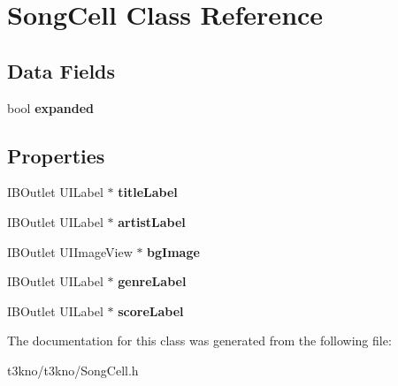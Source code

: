 \hypertarget{interface_song_cell}{\section{Song\-Cell Class Reference}
\label{interface_song_cell}
}
\subsection*{Data Fields}
\begin{DoxyCompactItemize}
\item 
\hypertarget{interface_song_cell_a509de781a41934b9e43ee410f0eb8a03}{bool {\bfseries expanded}}\label{interface_song_cell_a509de781a41934b9e43ee410f0eb8a03}

\end{DoxyCompactItemize}
\subsection*{Properties}
\begin{DoxyCompactItemize}
\item 
\hypertarget{interface_song_cell_a8e0a134662f4cb7ccaefa05eb89a8564}{I\-B\-Outlet U\-I\-Label $\ast$ {\bfseries title\-Label}}\label{interface_song_cell_a8e0a134662f4cb7ccaefa05eb89a8564}

\item 
\hypertarget{interface_song_cell_a5f4d80b3acc9a649d879e52f843e6fef}{I\-B\-Outlet U\-I\-Label $\ast$ {\bfseries artist\-Label}}\label{interface_song_cell_a5f4d80b3acc9a649d879e52f843e6fef}

\item 
\hypertarget{interface_song_cell_aba70af84a450137df72c13c45b117f0c}{I\-B\-Outlet U\-I\-Image\-View $\ast$ {\bfseries bg\-Image}}\label{interface_song_cell_aba70af84a450137df72c13c45b117f0c}

\item 
\hypertarget{interface_song_cell_a7cc4fe49be0d4422608c3d8c9e956594}{I\-B\-Outlet U\-I\-Label $\ast$ {\bfseries genre\-Label}}\label{interface_song_cell_a7cc4fe49be0d4422608c3d8c9e956594}

\item 
\hypertarget{interface_song_cell_aecc623a9c8837b2511980cb2dd331cf4}{I\-B\-Outlet U\-I\-Label $\ast$ {\bfseries score\-Label}}\label{interface_song_cell_aecc623a9c8837b2511980cb2dd331cf4}

\end{DoxyCompactItemize}


The documentation for this class was generated from the following file\-:\begin{DoxyCompactItemize}
\item 
t3kno/t3kno/Song\-Cell.\-h\end{DoxyCompactItemize}
